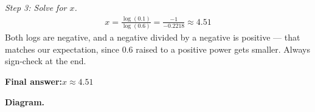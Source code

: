 \documentclass[11pt]{article}
\begin{document}
\textit{Step 3: Solve for \( x \).}
\[\begin{gathered}
x = \frac{\log(0.1)}{\log(0.6)} = \frac{-1}{-0.2218} \approx 4.51
\end{gathered}\]
Both logs are negative, and a negative divided by a negative is positive --- that matches our expectation, since \( 0.6 \) raised to a positive power gets smaller. Always sign-check at the end.

\begin{answerbox}
\textbf{Final answer:}\quad \(\displaystyle  x \approx 4.51 \)
\end{answerbox}
\textbf{Diagram.}

\begin{center}
\end{center}
\end{document}
